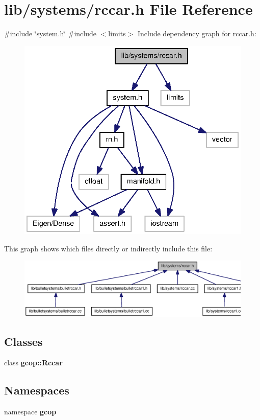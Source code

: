 \section{lib/systems/rccar.h \-File \-Reference}
\label{rccar_8h}
{\ttfamily \#include \char`\"{}system.\-h\char`\"{}}\*
{\ttfamily \#include $<$limits$>$}\*
\-Include dependency graph for rccar.\-h\-:\nopagebreak
\begin{figure}[H]
\begin{center}
\leavevmode
\includegraphics[width=336pt]{rccar_8h__incl}
\end{center}
\end{figure}
\-This graph shows which files directly or indirectly include this file\-:\nopagebreak
\begin{figure}[H]
\begin{center}
\leavevmode
\includegraphics[width=350pt]{rccar_8h__dep__incl}
\end{center}
\end{figure}
\subsection*{\-Classes}
\begin{DoxyCompactItemize}
\item 
class {\bf gcop\-::\-Rccar}
\end{DoxyCompactItemize}
\subsection*{\-Namespaces}
\begin{DoxyCompactItemize}
\item 
namespace {\bf gcop}
\end{DoxyCompactItemize}
